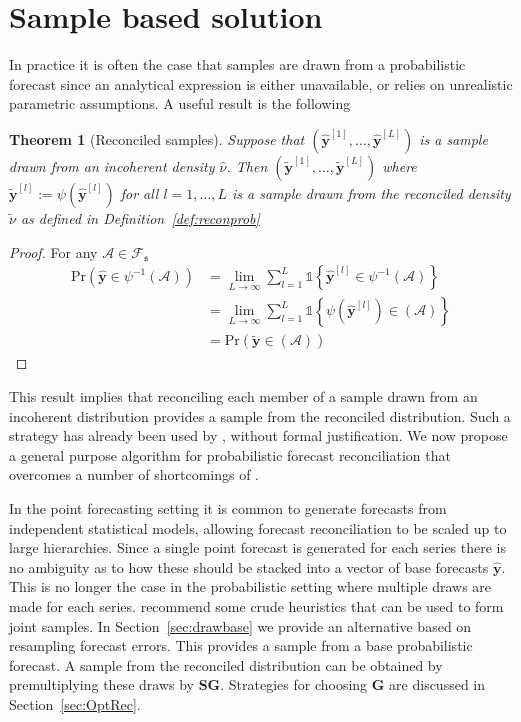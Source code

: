 \documentclass[12pt]{article}
\newtheorem{theo}{Theorem}[section]
\theoremstyle{definition}
\begin{document}
\section{Sample based solution}\label{sec:SampleSolution}

In practice it is often the case that samples are drawn from a probabilistic forecast since an analytical expression is either unavailable, or relies on unrealistic parametric assumptions.  A useful result is the following
\begin{theo}[Reconciled samples]
	Suppose that $\left(\hat{\bm y}^{[1]},\ldots,\hat{\bm y}^{[L]}\right)$ is a sample drawn from an incoherent density $\hat{\nu}$.  Then $\left(\tilde{\bm y}^{[1]},\ldots,\tilde{\bm y}^{[L]}\right)$ where $\tilde{\bm y}^{[l]}:=\psi(\hat{\bm y}^{[l]})$ for all $l=1,\ldots,L$ is a sample drawn from the reconciled density $\tilde{\nu}$ as defined in Definition~\ref{def:reconprob}
\end{theo}
\begin{proof}
	For any $\mathcal{A}\in\mathscr{F}_{\mathfrak{s}}$
\begin{align}
	\mbox{Pr}(\hat{{\bm y}}\in\psi^{-1}(\mathcal{A}))&=\underset{L\rightarrow\infty}{\lim}\sum\limits_{l=1}^L\mathbb{1}\left\{\hat{\bm y}^{[l]}\in\psi^{-1}(\mathcal{A})\right\}\nonumber\\
	&=\underset{L\rightarrow\infty}{\lim}\sum\limits_{l=1}^L\mathbb{1}\left\{\psi(\hat{\bm y}^{[l]})\in(\mathcal{A})\right\}\nonumber\\
	&=\mbox{Pr}(\tilde{{\bm y}}\in(\mathcal{A}))\nonumber
\end{align}
\end{proof}

This result implies that reconciling each member of a sample drawn from an incoherent distribution provides a sample from the reconciled distribution.  Such a strategy has already been used by \cite{JeoEtAl2019}, without formal justification.  We now propose a general purpose algorithm for probabilistic forecast reconciliation that overcomes a number of shortcomings of \cite{JeoEtAl2019}.

In the point forecasting setting it is common to generate forecasts from independent statistical models, allowing forecast reconciliation to be scaled up to large hierarchies.  Since a single point forecast is generated for each series there is no ambiguity as to how these should be stacked into a vector of base forecasts $\hat{\bm{y}}$.  This is no longer the case in the probabilistic setting where multiple draws are made for each series.  \cite{JeoEtAl2019} recommend some crude heuristics that can be used to form joint samples.  In Section~\ref{sec:drawbase} we provide an alternative based on resampling forecast errors. This provides a sample from a base probabilistic forecast. A sample from the reconciled distribution can be obtained by premultiplying these draws by $\bm{S}\bm{G}$. Strategies for choosing $\bm{G}$ are discussed in Section~\ref{sec:OptRec}.
\end{document}
